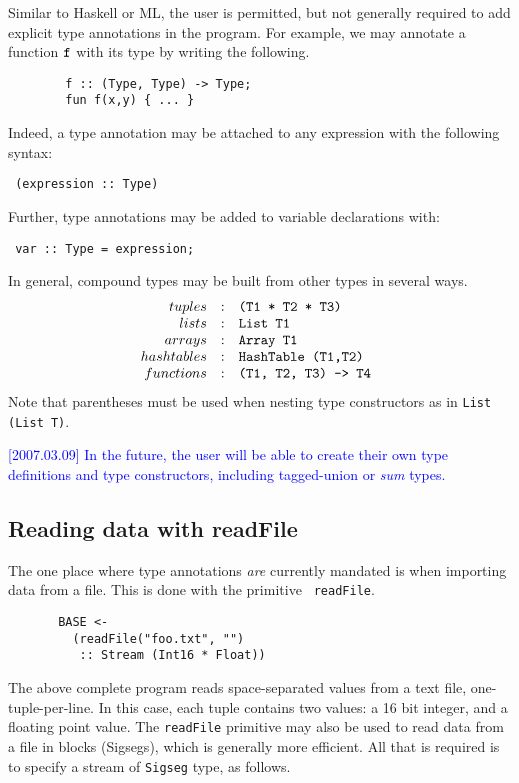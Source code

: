 \documentclass[twocolumn]{report}
\newcommand{\rednote}[1]{{\textcolor{blue}{#1}}}
\newenvironment{wscode}{\begin{center}\tt}{\end{center}}
\begin{document}
Similar to Haskell or ML, the user is permitted, but not generally
required to add explicit type annotations in the program.  For
example, we may annotate a function {$\tt f$} with its type by writing
the following.
%
\begin{verbatim}
        f :: (Type, Type) -> Type;
        fun f(x,y) { ... }
\end{verbatim}

Indeed, a type annotation may be attached to any expression with
the following syntax:
\begin{wscode}
(expression :: Type)
\end{wscode}

Further, type annotations may be added to variable declarations with:
\begin{wscode}
 var :: Type = expression;
\end{wscode}

In general, compound types may be built from other types in several
ways.  
\[
\begin{array}{rcl}
tuples           & : & $\tt (T1 * T2 * T3) $   \\
lists            & : & $\tt List T1 $ \\
arrays           & : & $\tt Array T1 $ \\
hashtables       & : & $\tt HashTable (T1,T2) $ \\
functions        & : & $\tt (T1, T2, T3) -> T4 $ \\
\end{array}
\]
Note that parentheses must be used when nesting type
constructors as in {\tt List (List T)}.

\rednote{[2007.03.09] In the future, the user will be able to create
  their own type definitions and type constructors, including
  tagged-union or {\em sum} types.}


\subsection{Reading data with readFile}

The one place where type annotations {\em are} currently mandated is
when importing data from a file.  This is done with the primitive {\tt
readFile}.
%
\begin{verbatim}
       BASE <- 
         (readFile("foo.txt", "") 
          :: Stream (Int16 * Float))
\end{verbatim}

The above complete program reads space-separated values from a text
file, one-tuple-per-line.  In this case, each tuple contains two
values: a 16 bit integer, and a floating point value.
The {\tt readFile} primitive may also be
used to read data from a file in blocks (Sigsegs), which is generally
more efficient.  All that is required is to specify a stream of
{\tt Sigseg} type, as follows.
\end{document}
